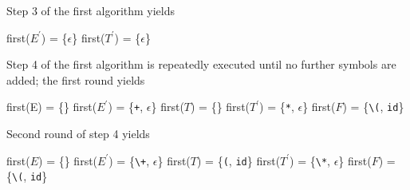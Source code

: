 \documentclass[8pt,a4paper,compress]{beamer}
\newcommand{\mm}[1]{$#1$}
\newcommand{\expo}[2]{$#1^{#2}$}
\newenvironment{spaced}
{
\smallskip
\hspace{.5cm}
\begin{minipage}[c]{\textwidth}
}
{
\end{minipage}
\smallskip
}
\begin{document}
\begin{frame}[fragile]
\pause

Step 3 of the first algorithm yields

\text{ }
\begin{spaced}
\begin{production}
first(\expo{E}{\prime}) = \{\mm{\epsilon}\}
first(\expo{T}{\prime}) = \{\mm{\epsilon}\}
\end{production}
\end{spaced}

\pause

Step 4 of the first algorithm is repeatedly executed until no further symbols are added; the first round yields

\text{ }
\begin{spaced}
\begin{production}
first(E)  = \{\}
first(\expo{E}{\prime}) = \{\lstinline{+}, \mm{\epsilon}\}
first(\mm{T})  = \{\}
first(\expo{T}{\prime}) = \{\lstinline{*}, \mm{\epsilon}\}
first(\mm{F})  = \{\lstinline{\(}, \lstinline{id}\}
\end{production}
\end{spaced}

\pause

Second round of step 4 yields

\text{ }
\begin{spaced}
\begin{production}
first(\mm{E})  = \{\}
first(\expo{E}{\prime}) = \{\lstinline{\+}, \mm{\epsilon}\}
first(\mm{T})  = \{\lstinline{(}, \lstinline{id}\}
first(\expo{T}{\prime}) = \{\lstinline{\*}, \mm{\epsilon}\}
first(\mm{F})  = \{\lstinline{\(}, \lstinline{id}\}
\end{production}
\end{spaced}
\end{frame}
\end{document}
